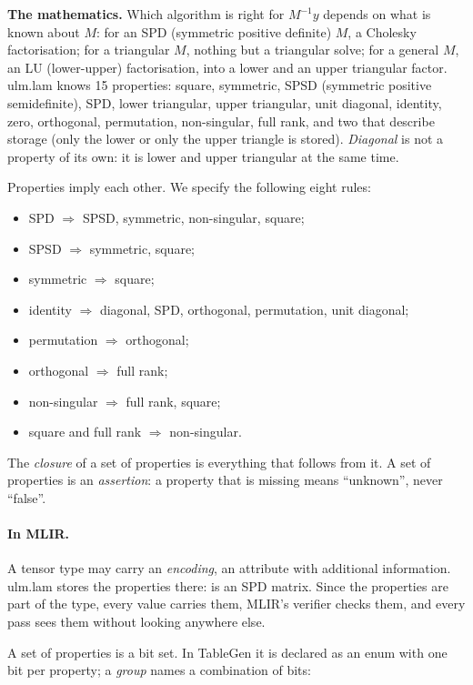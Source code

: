 \documentclass[11pt,a4paper]{article}
\newcommand{\inv}{^{-1}}
\let\origtexttt\texttt
\renewcommand{\texttt}[1]{\highLight[ttbg]{\origtexttt{#1}}}
\newenvironment{maths}{\par\medskip\noindent\begin{minipage}{\linewidth}%
  \setlength{\parskip}{\medskipamount}\sffamily\small
  \textbf{The mathematics.}\enspace}{\end{minipage}\par\medskip}
\begin{document}
\begin{maths}
Which algorithm is right for \(M\inv y\) depends on what is known about
\(M\): for an SPD (symmetric positive definite) \(M\), a Cholesky
factorisation; for a triangular \(M\), nothing but a triangular solve; for
a general \(M\), an LU (lower-upper) factorisation, into a lower
and an upper triangular factor. ulm.lam knows 15 properties: square, symmetric, SPSD
(symmetric positive semidefinite), SPD, lower triangular, upper triangular,
unit diagonal, identity, zero, orthogonal, permutation, non-singular, full
rank, and two that describe storage (only the lower or only the upper
triangle is stored). \emph{Diagonal} is not a property of its own: it is
lower and upper triangular at the same time.

Properties imply each other. We specify the following eight rules:
\begin{itemize}
\item SPD \(\Rightarrow\) SPSD, symmetric, non-singular, square;
\item SPSD \(\Rightarrow\) symmetric, square;
\item symmetric \(\Rightarrow\) square;
\item identity \(\Rightarrow\) diagonal, SPD, orthogonal, permutation,
  unit diagonal;
\item permutation \(\Rightarrow\) orthogonal;
\item orthogonal \(\Rightarrow\) full rank;
\item non-singular \(\Rightarrow\) full rank, square;
\item square and full rank \(\Rightarrow\) non-singular.
\end{itemize}
The \emph{closure} of a set of properties is everything that follows from
it. A set of properties is an \emph{assertion}: a property that is missing
means ``unknown'', never ``false''.
\end{maths}

\paragraph{In MLIR.}
A tensor type may carry an \emph{encoding}, an attribute with additional
information. ulm.lam stores the properties there:
\texttt{tensor<2000x2000xf64, \#ulm\_lam.props<spd>>} is an SPD matrix. Since the
properties are part of the type, every value carries them, MLIR's
verifier checks them, and every pass sees them without looking anywhere
else.

A set of properties is a bit set. In TableGen it is declared as an enum
with one bit per property; a \emph{group} names a combination of bits:
\end{document}
